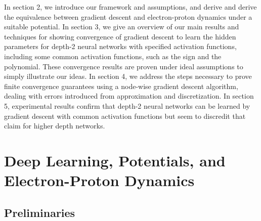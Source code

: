 \documentclass{article}
\begin{document}
In section 2, we introduce our framework and assumptions, and derive and derive the equivalence between gradient descent and electron-proton dynamics under a suitable potential. In section 3, we give an overview of our main results and techniques for showing convergence of gradient descent to learn the hidden parameters for depth-2 neural networks with specified activation functions, including some common activation functions, such as the sign and the polynomial. These convergence results are proven under ideal assumptions to simply illustrate our ideas. In section 4, we address the steps necessary to prove finite convergence guarantees using a node-wise gradient descent algorithm, dealing with errors introduced from approximation and discretization. In section 5, experimental results confirm that depth-2 neural networks can be learned by gradient descent with common activation functions but seem to discredit that claim for higher depth networks.  


\section{Deep Learning, Potentials, and Electron-Proton Dynamics}

\subsection{Preliminaries}
\end{document}
